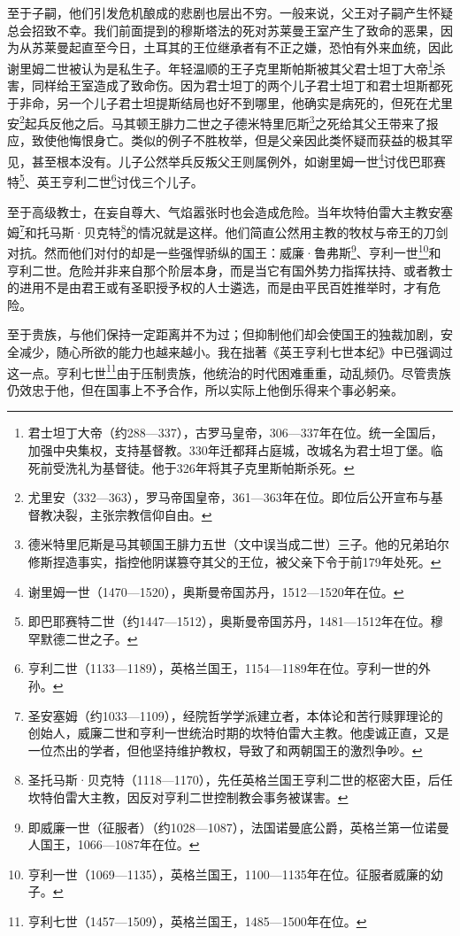 \par 至于子嗣，他们引发危机酿成的悲剧也层出不穷。一般来说，父王对子嗣产生怀疑总会招致不幸。我们前面提到的穆斯塔法的死对苏莱曼王室产生了致命的恶果，因为从苏莱曼起直至今日，土耳其的王位继承者有不正之嫌，恐怕有外来血统，因此谢里姆二世被认为是私生子。年轻温顺的王子克里斯帕斯被其父君士坦丁大帝\footnote{君士坦丁大帝（约288—337），古罗马皇帝，306—337年在位。统一全国后，加强中央集权，支持基督教。330年迁都拜占庭城，改城名为君士坦丁堡。临死前受洗礼为基督徒。他于326年将其子克里斯帕斯杀死。}杀害，同样给王室造成了致命伤。因为君士坦丁的两个儿子君士坦丁和君士坦斯都死于非命，另一个儿子君士坦提斯结局也好不到哪里，他确实是病死的，但死在尤里安\footnote{尤里安（332—363），罗马帝国皇帝，361—363年在位。即位后公开宣布与基督教决裂，主张宗教信仰自由。}起兵反他之后。马其顿王腓力二世之子德米特里厄斯\footnote{德米特里厄斯是马其顿国王腓力五世（文中误当成二世）三子。他的兄弟珀尔修斯捏造事实，指控他阴谋篡夺其父的王位，被父亲下令于前179年处死。}之死给其父王带来了报应，致使他悔恨身亡。类似的例子不胜枚举，但是父亲因此类怀疑而获益的极其罕见，甚至根本没有。儿子公然举兵反叛父王则属例外，如谢里姆一世\footnote{谢里姆一世（1470—1520），奥斯曼帝国苏丹，1512—1520年在位。}讨伐巴耶赛特\footnote{即巴耶赛特二世（约1447—1512），奥斯曼帝国苏丹，1481—1512年在位。穆罕默德二世之子。}、英王亨利二世\footnote{亨利二世（1133—1189），英格兰国王，1154—1189年在位。亨利一世的外孙。}讨伐三个儿子。
\par 至于高级教士，在妄自尊大、气焰嚣张时也会造成危险。当年坎特伯雷大主教安塞姆\footnote{圣安塞姆（约1033—1109），经院哲学学派建立者，本体论和苦行赎罪理论的创始人，威廉二世和亨利一世统治时期的坎特伯雷大主教。他虔诚正直，又是一位杰出的学者，但他坚持维护教权，导致了和两朝国王的激烈争吵。}和托马斯·贝克特\footnote{圣托马斯·贝克特（1118—1170），先任英格兰国王亨利二世的枢密大臣，后任坎特伯雷大主教，因反对亨利二世控制教会事务被谋害。}的情况就是这样。他们简直公然用主教的牧杖与帝王的刀剑对抗。然而他们对付的却是一些强悍骄纵的国王：威廉·鲁弗斯\footnote{即威廉一世（征服者）（约1028—1087），法国诺曼底公爵，英格兰第一位诺曼人国王，1066—1087年在位。}、亨利一世\footnote{亨利一世（1069—1135），英格兰国王，1100—1135年在位。征服者威廉的幼子。}和亨利二世。危险并非来自那个阶层本身，而是当它有国外势力指挥扶持、或者教士的进用不是由君王或有圣职授予权的人士遴选，而是由平民百姓推举时，才有危险。
\par 至于贵族，与他们保持一定距离并不为过；但抑制他们却会使国王的独裁加剧，安全减少，随心所欲的能力也越来越小。我在拙著《英王亨利七世本纪》中已强调过这一点。亨利七世\footnote{亨利七世（1457—1509），英格兰国王，1485—1500年在位。}由于压制贵族，他统治的时代困难重重，动乱频仍。尽管贵族仍效忠于他，但在国事上不予合作，所以实际上他倒乐得来个事必躬亲。

